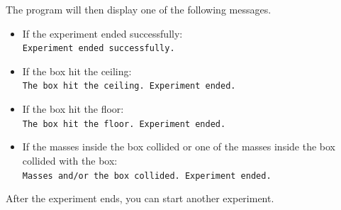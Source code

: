 The program will then display one of the following messages.
\begin{itemize}
\item If the experiment ended successfully:\\
\texttt{Experiment ended successfully.}
\item If the box hit the ceiling:\\
\texttt{The box hit the ceiling. Experiment ended.}
\item If the box hit the floor:\\
\texttt{The box hit the floor. Experiment ended.}
\item If the masses inside the box collided or one of the masses inside the box
collided with the box:\\
\texttt{Masses and/or the box collided. Experiment ended.}
\end{itemize}

After the experiment ends, you can start another experiment.
